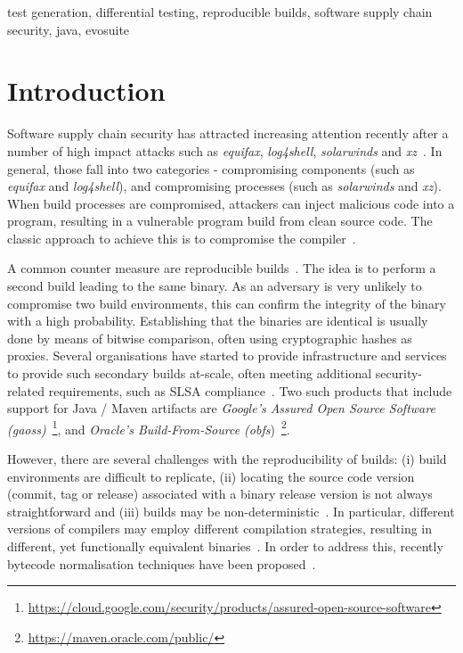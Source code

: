 \documentclass[conference]{IEEEtran}
\begin{document}
\begin{IEEEkeywords}
test generation, differential testing, reproducible builds, software supply chain security, java, evosuite
\end{IEEEkeywords}

\section{Introduction}

Software supply chain security has attracted increasing attention recently after a number of high impact attacks such as \textit{equifax}, \textit{log4shell}, \textit{solarwinds} and \textit{xz}~\cite{ellison2010evaluating,martinez2021software,enck2022top,EO14028}. In general, those fall into two categories - compromising components (such as \textit{equifax} and \textit{log4shell}), and compromising processes (such as \textit{solarwinds} and \textit{xz}). When build processes are compromised, attackers can inject malicious code into a program, resulting in a vulnerable program build from clean source code. The classic approach to achieve this is to compromise the compiler~\cite{thompson1984reflections}. 

A common counter measure are reproducible builds~\cite{reproduciblebuild, lamb2021reproducible}. The idea is to perform a second build leading to the same binary. As an adversary is very unlikely to compromise two build environments, this can confirm the integrity of the binary with a high probability. Establishing that the binaries are identical is usually done by means of bitwise comparison, often using cryptographic hashes as proxies.
Several organisations have started to provide infrastructure and services to provide such secondary builds at-scale, often meeting additional security-related requirements, such as SLSA compliance~\cite{slsa}. Two such products that include support for Java / Maven artifacts are \textit{Google's Assured Open Source Software (gaoss)}~\footnote{\url{https://cloud.google.com/security/products/assured-open-source-software}}, and \textit{Oracle's Build-From-Source (obfs})~\footnote{\url{https://maven.oracle.com/public/}}.

However, there are several challenges with the reproducibility of builds: (i) build environments are difficult to replicate, (ii) locating the source code version (commit, tag or release) associated with a binary release version is not always straightforward and (iii) builds may be non-deterministic~\cite{xiong2022towards,hassanshahi2023macaron,bineqdataset,keshani2024aroma}. In particular, different versions of compilers may employ different compilation strategies, resulting in different, yet functionally equivalent binaries~\cite{xiong2022towards,bineqdataset,schott2024JNorm}.  
In order to address this, recently bytecode normalisation techniques have been proposed~\cite{xiong2022towards,dietrich2024levelsbinaryequivalencecomparison,schott2024JNorm}. 
\end{document}
